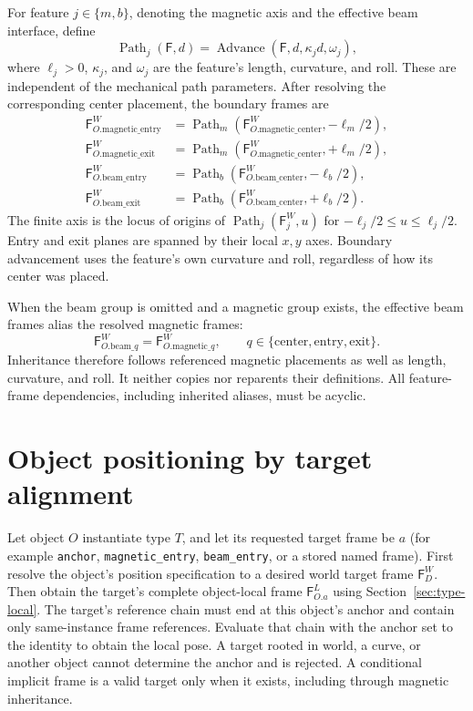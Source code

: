\documentclass[11pt,a4paper]{article}
\newcommand{\Frame}{\mathsf{F}}
\newcommand{\Path}{\operatorname{Path}}
\begin{document}
For feature $j\in\{m,b\}$, denoting the magnetic axis and the effective beam
interface, define
\begin{equation}
  \Path_j(\Frame,d)=\operatorname{Advance}(\Frame,d,\kappa_j d,\omega_j),
  \label{eq:feature-path}
\end{equation}
where $\ell_j>0$, $\kappa_j$, and $\omega_j$ are the feature's length,
curvature, and roll. These are independent of the mechanical path parameters.
After resolving the corresponding center placement, the boundary frames are
\begin{align}
  \Frame_{O.\mathrm{magnetic\_entry}}^W
    &=\Path_m(\Frame_{O.\mathrm{magnetic\_center}}^W,-\ell_m/2),\\
  \Frame_{O.\mathrm{magnetic\_exit}}^W
    &=\Path_m(\Frame_{O.\mathrm{magnetic\_center}}^W,+\ell_m/2),
  \label{eq:magnetic-frames}\\
  \Frame_{O.\mathrm{beam\_entry}}^W
    &=\Path_b(\Frame_{O.\mathrm{beam\_center}}^W,-\ell_b/2),\\
  \Frame_{O.\mathrm{beam\_exit}}^W
    &=\Path_b(\Frame_{O.\mathrm{beam\_center}}^W,+\ell_b/2).
  \label{eq:beam-frames}
\end{align}
The finite axis is the locus of origins of $\Path_j(\Frame_j^W,u)$ for
$-\ell_j/2\le u\le\ell_j/2$. Entry and exit planes are spanned by their
local $x,y$ axes. Boundary advancement uses the feature's own curvature and
roll, regardless of how its center was placed.

When the beam group is omitted and a magnetic group exists, the effective
beam frames alias the resolved magnetic frames:
\begin{equation}
  \Frame_{O.\mathrm{beam\_}q}^W=\Frame_{O.\mathrm{magnetic\_}q}^W,
  \qquad q\in\{\mathrm{center},\mathrm{entry},\mathrm{exit}\}.
  \label{eq:beam-inheritance}
\end{equation}
Inheritance therefore follows referenced magnetic placements as well as
length, curvature, and roll. It neither copies nor reparents their definitions.
All feature-frame dependencies, including inherited aliases, must be acyclic.

\section{Object positioning by target alignment}
\label{sec:object-alignment}

Let object $O$ instantiate type $T$, and let its requested target frame be
$a$ (for example \texttt{anchor}, \texttt{magnetic\_entry}, \texttt{beam\_entry}, or a stored named
frame).  First resolve the object's position specification to a desired world
target frame $\Frame_D^W$. Then obtain the target's complete object-local
frame $\Frame_{O.a}^{L}$ using Section~\ref{sec:type-local}. The target's reference chain must end at this object's anchor and contain
only same-instance frame references. Evaluate that chain with the anchor set
to the identity to obtain the local pose. A target rooted in world, a curve,
or another object cannot determine the anchor and is rejected. A conditional implicit frame is a valid target only
when it exists, including through magnetic inheritance.
\end{document}
